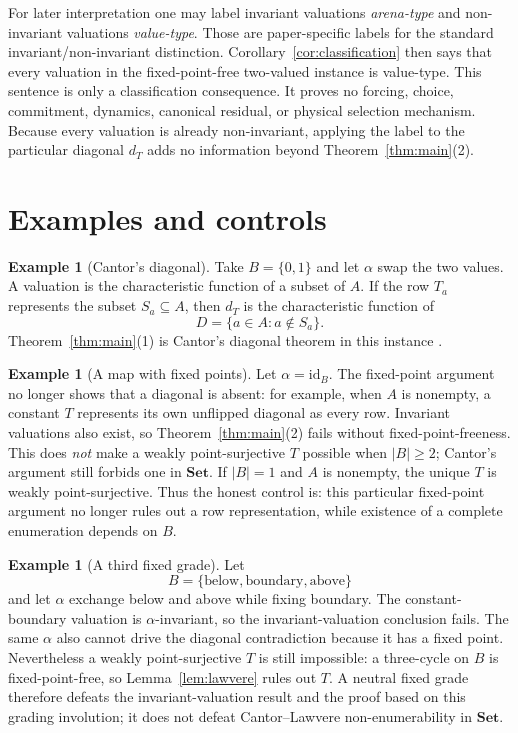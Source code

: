 \documentclass[11pt]{article}
\theoremstyle{definition}
\newtheorem{example}[theorem]{Example}
\theoremstyle{remark}
\newcommand{\id}{\mathrm{id}}
\begin{document}
For later interpretation one may label invariant valuations \emph{arena-type} and non-invariant valuations \emph{value-type}. Those are paper-specific labels for the standard invariant/non-invariant distinction. Corollary~\ref{cor:classification} then says that every valuation in the fixed-point-free two-valued instance is value-type. This sentence is only a classification consequence. It proves no forcing, choice, commitment, dynamics, canonical residual, or physical selection mechanism. Because every valuation is already non-invariant, applying the label to the particular diagonal $d_T$ adds no information beyond Theorem~\ref{thm:main}(2).

\section{Examples and controls}
\label{sec:examples}

\begin{example}[Cantor's diagonal]
\label{ex:cantor}
Take $B=\{0,1\}$ and let $\alpha$ swap the two values. A valuation is the characteristic function of a subset of $A$. If the row $T_a$ represents the subset $S_a\subseteq A$, then $d_T$ is the characteristic function of
\[
D=\{a\in A:a\notin S_a\}.
\]
Theorem~\ref{thm:main}(1) is Cantor's diagonal theorem in this instance \cite{cantor1891}.
\end{example}

\begin{example}[A map with fixed points]
\label{ex:identity}
Let $\alpha=\id_B$. The fixed-point argument no longer shows that a diagonal is absent: for example, when $A$ is nonempty, a constant $T$ represents its own unflipped diagonal as every row. Invariant valuations also exist, so Theorem~\ref{thm:main}(2) fails without fixed-point-freeness. This does \emph{not} make a weakly point-surjective $T$ possible when $|B|\geq2$; Cantor's argument still forbids one in $\mathbf{Set}$. If $|B|=1$ and $A$ is nonempty, the unique $T$ is weakly point-surjective. Thus the honest control is: this particular fixed-point argument no longer rules out a row representation, while existence of a complete enumeration depends on $B$.
\end{example}

\begin{example}[A third fixed grade]
\label{ex:thirdgrade}
Let
\[
B=\{\text{below},\text{boundary},\text{above}\}
\]
and let $\alpha$ exchange below and above while fixing boundary. The constant-boundary valuation is $\alpha$-invariant, so the invariant-valuation conclusion fails. The same $\alpha$ also cannot drive the diagonal contradiction because it has a fixed point. Nevertheless a weakly point-surjective $T$ is still impossible: a three-cycle on $B$ is fixed-point-free, so Lemma~\ref{lem:lawvere} rules out $T$. A neutral fixed grade therefore defeats the invariant-valuation result and the proof based on this grading involution; it does not defeat Cantor--Lawvere non-enumerability in $\mathbf{Set}$.
\end{example}
\end{document}
